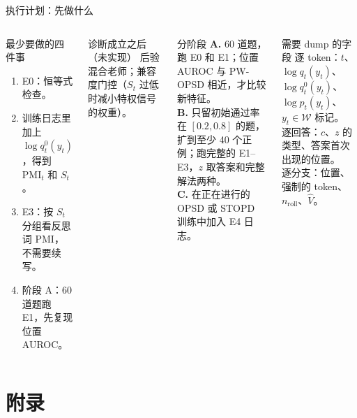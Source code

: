 \documentclass[aspectratio=169,11pt]{beamer}
\newcommand{\PMI}{\mathrm{PMI}}
\newcommand{\Vh}{\hat V}
\begin{document}
\begin{frame}{执行计划：先做什么}
\begin{columns}[T]
\begin{block}{最少要做的四件事}
\footnotesize
\begin{enumerate}
  \setlength\itemsep{2pt}
  \item E0：恒等式检查。
  \item 训练日志里加上 $\log q^0_t(y_t)$，得到 $\PMI_t$ 和 $S_t$。
  \item E3：按 $S_t$ 分组看反思词 PMI，不需要续写。
  \item 阶段 A：60 道题跑 E1，先复现位置 AUROC。
\end{enumerate}
\end{block}
\begin{exampleblock}{诊断成立之后（未实现）}
\footnotesize
后验混合老师；兼容度门控（$S_t$ 过低时减小特权信号的权重）。
\end{exampleblock}
\begin{block}{分阶段}
\footnotesize
\textbf{A.} 60 道题，跑 E0 和 E1；位置 AUROC 与 PW-OPSD 相近，才比较新特征。\\[3pt]
\textbf{B.} 只留初始通过率在 $[0.2,0.8]$ 的题，扩到至少 40 个正例；跑完整的 E1--E3，$z$ 取答案和完整解法两种。\\[3pt]
\textbf{C.} 在正在进行的 OPSD 或 STOPD 训练中加入 E4 日志。
\end{block}
\begin{block}{需要 dump 的字段}
\footnotesize
逐 token：$t$、$\log q_t(y_t)$、$\log q^0_t(y_t)$、$\log p_t(y_t)$、$y_t\in\mathcal W$ 标记。\\
逐回答：$c$、$z$ 的类型、答案首次出现的位置。\\
逐分支：位置、强制的 token、$n_{\mathrm{roll}}$、$\Vh$。
\end{block}
\end{columns}
\end{frame}

\section{附录}
\end{document}
